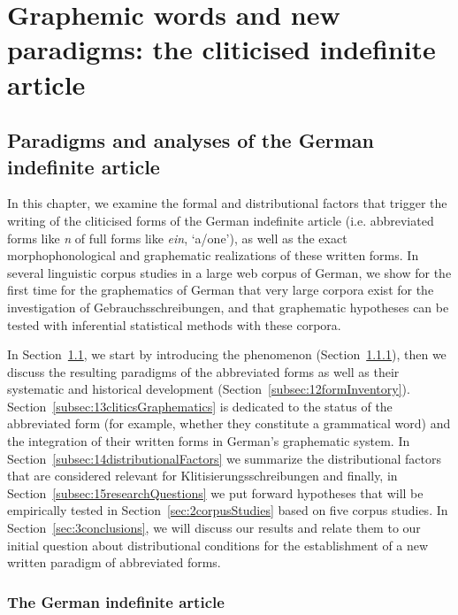 \chapter{Graphemic words and new paradigms: the cliticised indefinite article}
\label{sec:graphemicwordsandnewparadigms}


\section{Paradigms and analyses of the German indefinite article}
\label{sec:1paradigmsAndAnalyses}

In this chapter, we examine the formal and distributional factors that trigger the writing of the cliticised forms of the German indefinite article (i.e. abbreviated forms like \textit{n} of full forms like \textit{ein}, `a/one'), as well as the exact morphophonological and graphematic realizations of these written forms. 
In several linguistic corpus studies in a large web corpus of German, we show for the first time for the graphematics of German that very large corpora exist for the investigation of Gebrauchsschreibungen, and that graphematic hypotheses can be tested with inferential statistical methods with these corpora.

In Section~\ref{sec:1paradigmsAndAnalyses}, we start by introducing the phenomenon (Section~\ref{subsec:11GermIndefArticle}), then we discuss the resulting paradigms of the abbreviated forms as well as their systematic and historical development (Section~\ref{subsec:12formInventory}).
Section~\ref{subsec:13cliticsGraphematics} is dedicated to the status of the abbreviated form (for example, whether they constitute a grammatical word) and the integration of their written forms in German's graphematic system.
In Section~\ref{subsec:14distributionalFactors} we summarize the distributional factors that are considered relevant for Klitisierungsschreibungen and finally, in Section~\ref{subsec:15researchQuestions} we put forward hypotheses that will be empirically tested in Section~\ref{sec:2corpusStudies} based on five corpus studies.
In Section~\ref{sec:3conclusions}, we will discuss our results and relate them to our initial question about distributional conditions for the establishment of a new written paradigm of abbreviated forms.

\subsection{The German indefinite article}
\label{subsec:11GermIndefArticle}

